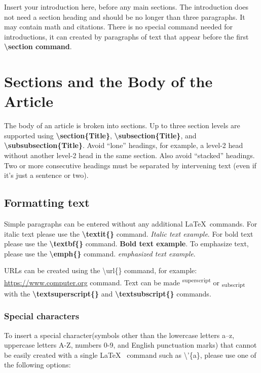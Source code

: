 \documentclass[hasAbstract,authorBox]{csmagazine}
\begin{document}
Insert your introduction here, before any main sections. The introduction does not need a section heading and should be no longer than three paragraphs. It may contain math and citations. There is no special command needed for introductions, it can created by paragraphs of text that appear before the first \textbf{\textbackslash{}section command}.

\section{Sections and the Body of the Article}

The body of an article is broken into sections. Up to three section levels are supported using \textbf{\textbackslash{}section\{Title\}}, \textbf{\textbackslash{}subsection\{Title\}}, and \textbf{\textbackslash{}subsubsection\{Title\}}. Avoid ``lone'' headings, for example, a level-2 head without another level-2 head in the same section. Also avoid ``stacked'' headings. Two or more consecutive headings must be separated by intervening text (even if it's just a sentence or two).

\subsection{Formatting text}

Simple paragraphs can be entered without any additional \LaTeX\ commands. For italic text please use the \textbf{\textbackslash{}textit\{\}} command. \textit{Italic text example}. For bold text please use the \textbf{\textbackslash{}textbf\{\}} command. \textbf{Bold text example}. To emphasize text, please use the \textbf{\textbackslash{}emph\{\}} command. \emph{emphasized text example}.

URLs can be created using the \textbackslash{}url\{\} command, for example: \url{https://www.computer.org} command. Text can be made \textsuperscript{superscript} or \textsubscript{subscript} with the \textbf{\textbackslash{}textsuperscript\{\}} and \textbf{\textbackslash{}textsubscript\{\}} commands.

\subsubsection{Special characters}

To insert a special character(symbols other than the lowercase letters a–z, uppercase letters A-Z, numbers 0-9, and English punctuation marks) that cannot be easily created with a single \LaTeX~ command such as \textbackslash{}'\{a\}, please use one of the following options:
\end{document}
